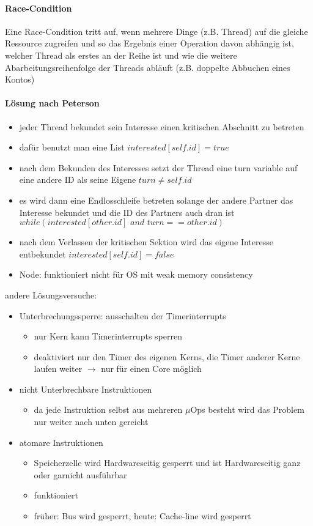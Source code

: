 \documentclass[12pt,a4paper]{article}
\begin{document}
\paragraph{Race-Condition}
\flushleft
Eine Race-Condition tritt auf, wenn mehrere Dinge (z.B. Thread) auf die gleiche Ressource zugreifen und so das Ergebnis einer Operation davon abhängig ist, welcher Thread als erstes an der Reihe ist und wie die weitere Abarbeitungsreihenfolge der Threads abläuft (z.B. doppelte Abbuchen eines Kontos)

\paragraph{Lösung nach Peterson}
\flushleft
\begin{itemize}
\item jeder Thread bekundet sein Interesse einen kritischen Abschnitt zu betreten
\item dafür benutzt man eine List $interested[self.id] = true$
\item nach dem Bekunden des Interesses setzt der Thread eine turn variable auf eine andere ID als seine Eigene $turn\neq self.id$
\item es wird dann eine Endlosschleife betreten solange der andere Partner das Interesse bekundet und die ID des Partners auch dran ist $while (interested[other.id]\hspace{4pt} and\hspace{4pt} turn == other.id)$
\item nach dem Verlassen der kritischen Sektion wird das eigene Interesse entbekundet $interested[self.id] = false$
\item Node: funktioniert nicht für OS mit weak memory consistency
\end{itemize}
andere Lösungsversuche:
\begin{itemize}
\item Unterbrechungssperre: ausschalten der Timerinterrupts
\begin{itemize}
\item nur Kern kann Timerinterrupts sperren
\item deaktiviert nur den Timer des eigenen Kerns, die Timer anderer Kerne laufen weiter $\rightarrow$ nur für einen Core möglich
\end{itemize}
\item nicht Unterbrechbare Instruktionen
\begin{itemize}
\item da jede Instruktion selbst aus mehreren $\mu$Ops besteht wird das Problem nur weiter nach unten gereicht
\end{itemize}
\item atomare Instruktionen
\begin{itemize}
\item Speicherzelle wird Hardwareseitig gesperrt und ist Hardwareseitig ganz oder garnicht ausführbar
\item funktioniert
\item früher: Bus wird gesperrt, heute: Cache-line wird gesperrt
\end{itemize}
\end{itemize}
\end{document}

